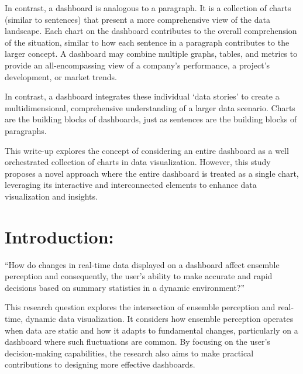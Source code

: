 \documentclass[print]{nuthesis}
\begin{document}
In contrast, a dashboard is analogous to a paragraph.
It is a collection of charts (similar to sentences) that present a more comprehensive view of the data landscape.
Each chart on the dashboard contributes to the overall comprehension of the situation, similar to how each sentence in a paragraph contributes to the larger concept.
A dashboard may combine multiple graphs, tables, and metrics to provide an all-encompassing view of a company's performance, a project's development, or market trends.

In contrast, a dashboard integrates these individual `data stories' to create a multidimensional, comprehensive understanding of a larger data scenario.
Charts are the building blocks of dashboards, just as sentences are the building blocks of paragraphs.

This write-up explores the concept of considering an entire dashboard as a well orchestrated collection of charts in data visualization.
However, this study proposes a novel approach where the entire dashboard is treated as a single chart, leveraging its interactive and interconnected elements to enhance data visualization and insights.

\hypertarget{introduction-2}{%
\section{Introduction:}\label{introduction-2}}

``How do changes in real-time data displayed on a dashboard affect ensemble perception and consequently, the user's ability to make accurate and rapid decisions based on summary statistics in a dynamic environment?''

This research question explores the intersection of ensemble perception and real-time, dynamic data visualization.
It considers how ensemble perception operates when data are static and how it adapts to fundamental changes, particularly on a dashboard where such fluctuations are common.
By focusing on the user's decision-making capabilities, the research also aims to make practical contributions to designing more effective dashboards.
\end{document}
